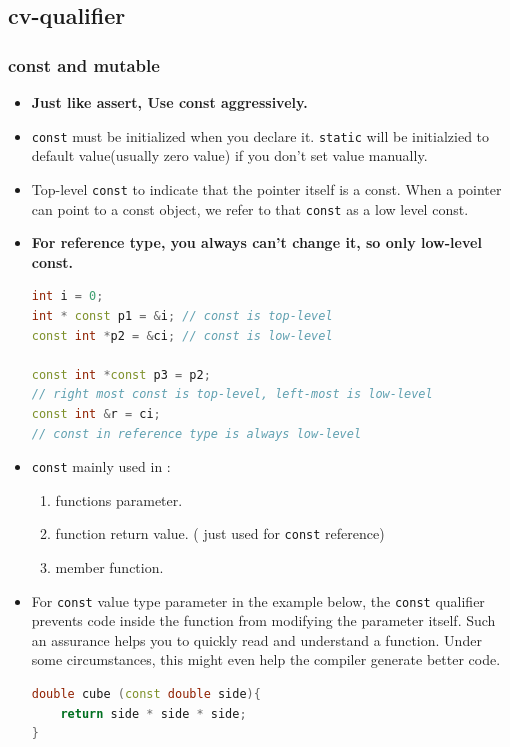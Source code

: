 \documentclass[a4paper,12pt,twoside]{book}
\begin{document}
\subsection{cv-qualifier}

\subsubsection{const and mutable}
\begin{itemize}
\item \textbf{Just like assert, Use const aggressively.}

\item \texttt{const} must be initialized when you declare it. \texttt{static} will be initialzied to default value(usually zero value) if you don't set value manually. 

\item Top-level \texttt{const} to indicate that the pointer itself is a const. When a pointer can point to a const object, we refer to that \texttt{const} as a low level const.

\item \textbf{For reference type, you always can't change it, so only low-level const.}
\begin{lstlisting}[frame=single, language=c++]
int i = 0;
int * const p1 = &i; // const is top-level
const int *p2 = &ci; // const is low-level

const int *const p3 = p2;
// right most const is top-level, left-most is low-level
const int &r = ci;
// const in reference type is always low-level
\end{lstlisting}


\item \texttt{const} mainly used in :
\begin{enumerate}
\item functions parameter.
\item function return value. ( just used for \texttt{const} reference)
\item member function.
\end{enumerate}

\item For \texttt{const} value type parameter in the example below, the \texttt{const} qualifier prevents code inside the function from modifying the parameter itself. Such an assurance helps you to quickly read and understand a function. Under some circumstances, this might even help the compiler generate better code. 
\begin{lstlisting}[frame=single, language=c++]
double cube (const double side){
    return side * side * side;
}
\end{lstlisting}


\end{itemize}
\end{document}
